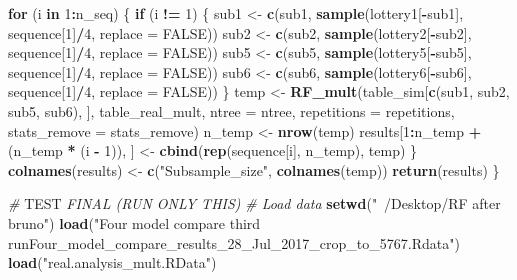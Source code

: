 \documentclass[]{book}
\newenvironment{Shaded}{\begin{snugshade}}{\end{snugshade}}
\newcommand{\KeywordTok}[1]{\textcolor[rgb]{0.13,0.29,0.53}{\textbf{{#1}}}}
\newcommand{\DataTypeTok}[1]{\textcolor[rgb]{0.13,0.29,0.53}{{#1}}}
\newcommand{\DecValTok}[1]{\textcolor[rgb]{0.00,0.00,0.81}{{#1}}}
\newcommand{\StringTok}[1]{\textcolor[rgb]{0.31,0.60,0.02}{{#1}}}
\newcommand{\CommentTok}[1]{\textcolor[rgb]{0.56,0.35,0.01}{\textit{{#1}}}}
\newcommand{\OtherTok}[1]{\textcolor[rgb]{0.56,0.35,0.01}{{#1}}}
\newcommand{\ControlFlowTok}[1]{\textcolor[rgb]{0.13,0.29,0.53}{\textbf{{#1}}}}
\newcommand{\OperatorTok}[1]{\textcolor[rgb]{0.81,0.36,0.00}{\textbf{{#1}}}}
\newcommand{\AlertTok}[1]{\textcolor[rgb]{0.94,0.16,0.16}{{#1}}}
\newcommand{\NormalTok}[1]{{#1}}
\theoremstyle{definition}
\theoremstyle{definition}
\theoremstyle{definition}
\theoremstyle{remark}
\begin{document}
\begin{Shaded}
\begin{Highlighting}[]
 \ControlFlowTok{for}\NormalTok{ (i }\ControlFlowTok{in} \DecValTok{1}\OperatorTok{:}\NormalTok{n_seq) \{}
   \ControlFlowTok{if}\NormalTok{ (i }\OperatorTok{!=}\StringTok{ }\DecValTok{1}\NormalTok{) \{}
\NormalTok{     sub1 <-}\StringTok{ }\KeywordTok{c}\NormalTok{(sub1, }\KeywordTok{sample}\NormalTok{(lottery1[}\OperatorTok{-}\NormalTok{sub1], sequence[}\DecValTok{1}\NormalTok{]}\OperatorTok{/}\DecValTok{4}\NormalTok{, }\DataTypeTok{replace =} \OtherTok{FALSE}\NormalTok{))}
\NormalTok{     sub2 <-}\StringTok{ }\KeywordTok{c}\NormalTok{(sub2, }\KeywordTok{sample}\NormalTok{(lottery2[}\OperatorTok{-}\NormalTok{sub2], sequence[}\DecValTok{1}\NormalTok{]}\OperatorTok{/}\DecValTok{4}\NormalTok{, }\DataTypeTok{replace =} \OtherTok{FALSE}\NormalTok{))}
\NormalTok{     sub5 <-}\StringTok{ }\KeywordTok{c}\NormalTok{(sub5, }\KeywordTok{sample}\NormalTok{(lottery5[}\OperatorTok{-}\NormalTok{sub5], sequence[}\DecValTok{1}\NormalTok{]}\OperatorTok{/}\DecValTok{4}\NormalTok{, }\DataTypeTok{replace =} \OtherTok{FALSE}\NormalTok{))}
\NormalTok{     sub6 <-}\StringTok{ }\KeywordTok{c}\NormalTok{(sub6, }\KeywordTok{sample}\NormalTok{(lottery6[}\OperatorTok{-}\NormalTok{sub6], sequence[}\DecValTok{1}\NormalTok{]}\OperatorTok{/}\DecValTok{4}\NormalTok{, }\DataTypeTok{replace =} \OtherTok{FALSE}\NormalTok{))}
\NormalTok{   \}}
\NormalTok{   temp <-}\StringTok{ }\KeywordTok{RF_mult}\NormalTok{(table_sim[}\KeywordTok{c}\NormalTok{(sub1, sub2, sub5, sub6), ], table_real_mult,}
                   \DataTypeTok{ntree =}\NormalTok{ ntree, }\DataTypeTok{repetitions =}\NormalTok{ repetitions,}
                   \DataTypeTok{stats_remove =}\NormalTok{ stats_remove)}
\NormalTok{   n_temp <-}\StringTok{ }\KeywordTok{nrow}\NormalTok{(temp)}
\NormalTok{   results[}\DecValTok{1}\OperatorTok{:}\NormalTok{n_temp }\OperatorTok{+}\StringTok{ }\NormalTok{(n_temp }\OperatorTok{*}\StringTok{ }\NormalTok{(i }\OperatorTok{-}\StringTok{ }\DecValTok{1}\NormalTok{)), ] <-}\StringTok{ }\KeywordTok{cbind}\NormalTok{(}\KeywordTok{rep}\NormalTok{(sequence[i],}
\NormalTok{                                                         n_temp), temp)}
\NormalTok{ \}}
 \KeywordTok{colnames}\NormalTok{(results) <-}\StringTok{ }\KeywordTok{c}\NormalTok{(}\StringTok{"Subsample_size"}\NormalTok{, }\KeywordTok{colnames}\NormalTok{(temp))}
 \KeywordTok{return}\NormalTok{(results)}
\NormalTok{\}}

\CommentTok{# }\AlertTok{TEST}\CommentTok{ FINAL (RUN ONLY THIS)}
\CommentTok{# Load data}
\KeywordTok{setwd}\NormalTok{(}\StringTok{"~/Desktop/RF after bruno"}\NormalTok{)}
\KeywordTok{load}\NormalTok{(}\StringTok{"Four model compare third runFour_model_compare_results_28_Jul_2017_crop_to_5767.Rdata"}\NormalTok{)}
\KeywordTok{load}\NormalTok{(}\StringTok{"real.analysis_mult.RData"}\NormalTok{)}


\end{Highlighting}
\end{Shaded}
\end{document}
